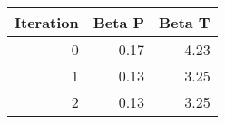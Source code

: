\begin{tabular}{rrr}
\toprule
 Iteration &  Beta P &  Beta T \\
\midrule
         0 &    0.17 &    4.23 \\
         1 &    0.13 &    3.25 \\
         2 &    0.13 &    3.25 \\
\bottomrule
\end{tabular}
